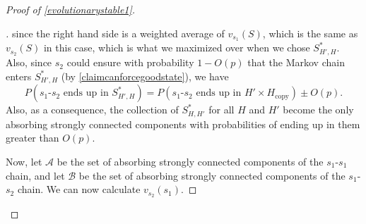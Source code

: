 \documentclass[12pt]{article}
\theoremstyle{definition}
\theoremstyle{remark}
\newenvironment{subproof}[1][\proofname]{%
  \renewcommand{\qedsymbol}{$\blacksquare$}%
  \begin{proof}[#1]%
}{%
  \end{proof}%
}
\begin{document}
\begin{proof}[Proof of \cref{evolutionarystable1}]
\begin{subproof}
        since the right hand side is a weighted average of $v_{s_1}(S)$, which is the same as $v_{s_2}(S)$ in this case, which is what we maximized over when we chose $S_{H', H}^*$. Also, since $s_2$ could ensure with probability $1 - O(p)$ that the Markov chain enters $S_{H',H}^*$ (by \cref{claimcanforcegoodstate}), we have
        \begin{equation}
          \label{eqshh}
          P(\text{$s_1$-$s_2$ ends up in $S_{H',H}^*$}) = P(\text{$s_1$-$s_2$ ends up in $H' \times H_\text{copy}$})  \pm O(p).
        \end{equation}
        Also, as a consequence, the collection of $S_{H,H'}^*$ for all $H$ and $H'$ become the only absorbing strongly connected components with probabilities of ending up in them greater than $O(p)$.

        Now, let $\mathcal{A}$ be the set of absorbing strongly connected components of the $s_1$-$s_1$ chain, and let $\mathcal{B}$ be the set of absorbing strongly connected components of the $s_1$-$s_2$ chain. We can now calculate $v_{s_2}(s_1)$.



\end{subproof}
\end{proof}
\end{document}
